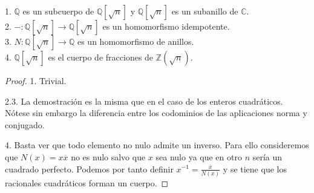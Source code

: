 \begin{proposition}
1. $\mathbb{Q}$ es un subcuerpo de $\mathbb{Q}[\sqrt{n}]$ y $\mathbb{Q}[\sqrt{n}]$ es un subanillo de $\mathbb{C}$.\\
2. $-:\mathbb{Q}[\sqrt{n}] \to \mathbb{Q}[\sqrt{n}]$ es un homomorfismo idempotente.\\
3. $N:\mathbb{Q}[\sqrt{n}] \to \mathbb{Q}$ es un homomorfismo de anillos.\\
4. $\mathbb{Q}[\sqrt{n}]$ es el cuerpo de fracciones de $\mathbb{Z}(\sqrt{n})$. 
\end{proposition}
\begin{proof}
1. Trivial. 

2.3. La demostración es la misma que en el caso de los enteros cuadráticos. Nótese sin embargo la diferencia entre los codominios de las aplicaciones norma y conjugado. 

4. Basta ver que todo elemento no nulo admite un inverso. Para ello consideremos que $N(x) = x \overline{x}$ no es nulo salvo que $x$ sea nulo ya que en otro $n$ sería un cuadrado perfecto. Podemos por tanto definir $x^{-1} = \frac{\overline{x}}{N(x)}$ y se tiene que los racionales cuadráticos forman un cuerpo. 
\end{proof}